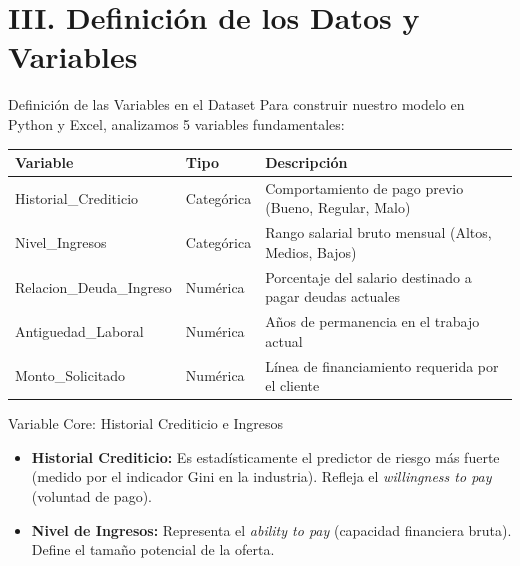 \documentclass[10pt, aspectratio=169]{beamer}
\begin{document}
	\section{III. Definición de los Datos y Variables}
	
	\begin{frame}{Definición de las Variables en el Dataset}
		Para construir nuestro modelo en Python y Excel, analizamos 5 variables fundamentales:
		\vspace{0.3cm}
		\begin{table}[]
			\small
			\begin{tabular}{lll}
				\toprule
				\textbf{Variable} & \textbf{Tipo} & \textbf{Descripción} \\ \midrule
				Historial\_Crediticio & Categórica & Comportamiento de pago previo (Bueno, Regular, Malo) \\
				Nivel\_Ingresos & Categórica & Rango salarial bruto mensual (Altos, Medios, Bajos) \\
				Relacion\_Deuda\_Ingreso & Numérica & Porcentaje del salario destinado a pagar deudas actuales \\
				Antiguedad\_Laboral & Numérica & Años de permanencia en el trabajo actual \\
				Monto\_Solicitado & Numérica & Línea de financiamiento requerida por el cliente \\ \bottomrule
			\end{tabular}
		\end{table}
	\end{frame}
	
	\begin{frame}{Variable Core: Historial Crediticio e Ingresos}
		\begin{itemize}
			\item \textbf{Historial Crediticio:} Es estadísticamente el predictor de riesgo más fuerte (medido por el indicador Gini en la industria). Refleja el \textit{willingness to pay} (voluntad de pago).
			\item \textbf{Nivel de Ingresos:} Representa el \textit{ability to pay} (capacidad financiera bruta). Define el tamaño potencial de la oferta.
		\end{itemize}
	\end{frame}
	
\end{document}
